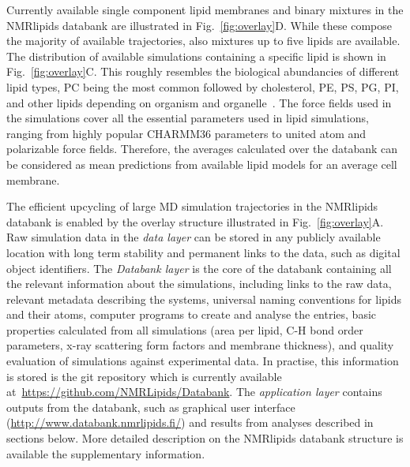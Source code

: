\documentclass[fleqn,10pt]{wlscirep}
\begin{document}
Currently available single component lipid membranes and binary mixtures in the NMRlipids databank are illustrated in Fig.~\ref{fig:overlay}D. While these compose the majority of available trajectories, also mixtures up to five lipids are available. The distribution of available simulations containing a specific lipid is shown in Fig.~\ref{fig:overlay}C. This roughly resembles the biological abundancies of different lipid types, PC being the most common  followed by cholesterol, PE, PS, PG, PI, and other lipids depending on organism and organelle~\cite{vanmeer08}. The force fields used in the simulations cover all the essential parameters used in lipid simulations, ranging from highly popular CHARMM36 parameters to united atom and polarizable force fields. Therefore, the averages calculated over the databank can be considered as mean predictions from available lipid models for an average cell membrane.

The efficient upcycling of large MD simulation trajectories in the NMRlipids databank is enabled by the overlay structure illustrated in Fig.~\ref{fig:overlay}A. Raw simulation data in the {\it data layer} can be stored in any publicly available location with long term stability and permanent links to the data, such as digital object identifiers. The {\it Databank layer} is the core of the databank containing all the relevant information about the simulations, including links to the raw data, relevant metadata describing the systems, universal naming conventions for lipids and their atoms, computer programs to create and analyse the entries, basic properties calculated from all simulations (area per lipid, C-H bond order parameters, x-ray scattering form factors and membrane thickness), and quality evaluation of simulations against experimental data. In practise, this information is stored is the git repository which is currently available at~\url{https://github.com/NMRLipids/Databank}. The {\it application layer} contains outputs from the databank, such as graphical user interface (\url{http://www.databank.nmrlipids.fi/}) and results from analyses described in sections below. More detailed description on the NMRlipids databank structure is available the supplementary information. 
\end{document}
